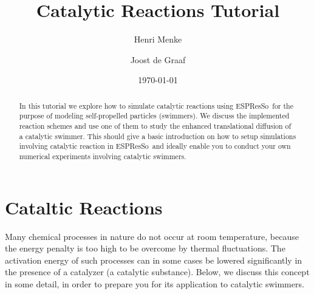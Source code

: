 \documentclass[aip,jcp,reprint,a4paper,onecolumn,nofootinbib,amsmath,amssymb]{revtex4-1}
\newcommand{\es}{\mbox{\textsf{ESPResSo}}\xspace}
\begin{document}
\title{Catalytic Reactions Tutorial}
\author{Henri Menke}
\author{Joost de Graaf}
\date{\today}

\begin{abstract}
  In this tutorial we explore how to simulate catalytic reactions using \es\ for the purpose of modeling self-propelled particles (swimmers). We discuss the implemented reaction schemes and use one of them to study the enhanced translational diffusion of a catalytic swimmer. This should give a basic introduction on how to setup simulations involving catalytic reaction in \es\ and ideally enable you to conduct your own numerical experiments involving catalytic swimmers.
\end{abstract}

\maketitle

\section{Cataltic Reactions}

Many chemical processes in nature do not occur at room temperature, because the energy penalty is too high to be overcome by thermal fluctuations. The activation energy of such processes can in some cases be lowered significantly in the presence of a catalyzer (a catalytic substance). Below, we discuss this concept in some detail, in order to prepare you for its application to catalytic swimmers.
\end{document}
